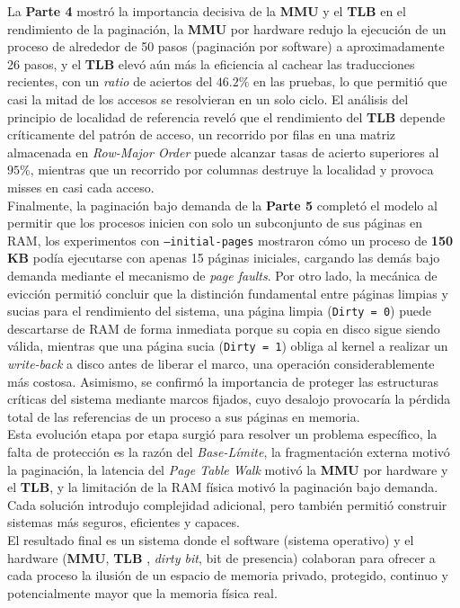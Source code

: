 \documentclass[12pt,letterpaper]{article}
\begin{document}
La \textbf{Parte 4} mostró la importancia decisiva de la \textbf{MMU} y el \textbf{TLB} en el rendimiento de la
paginación, la \textbf{MMU} por hardware redujo la ejecución de un proceso de alrededor de 50 pasos (paginación
por software) a aproximadamente 26 pasos, y el \textbf{TLB} elevó aún más la eficiencia al cachear las
traducciones recientes, con un \textit{ratio} de aciertos del $46.2\%$ en las pruebas, lo que permitió que casi
la mitad de los accesos se resolvieran en un solo ciclo. El análisis del principio de localidad de referencia
reveló que el rendimiento del \textbf{TLB} depende críticamente del patrón de acceso, un recorrido por filas en
una matriz almacenada en \textit{Row-Major Order} puede alcanzar tasas de acierto superiores al $95\%$, mientras
que un recorrido por columnas destruye la localidad y provoca misses en casi cada acceso.\\

Finalmente, la paginación bajo demanda de la \textbf{Parte 5} completó el modelo al permitir que los procesos
inicien con solo un subconjunto de sus páginas en RAM, los experimentos con \texttt{--initial-pages} mostraron
cómo un proceso de \textbf{150 KB} podía ejecutarse con apenas 15 páginas iniciales, cargando las demás bajo
demanda mediante el mecanismo de \textit{page faults}. Por otro lado, la mecánica de evicción permitió concluir
que la distinción fundamental entre páginas limpias y sucias para el rendimiento del sistema, una página limpia
(\texttt{Dirty = 0}) puede descartarse de RAM de forma inmediata porque su copia en disco sigue siendo válida,
mientras que una página sucia (\texttt{Dirty = 1}) obliga al kernel a realizar un \textit{write-back} a disco
antes de liberar el marco, una operación considerablemente más costosa. Asimismo, se confirmó la importancia de
proteger las estructuras críticas del sistema mediante marcos fijados, cuyo desalojo provocaría la pérdida total
de las referencias de un proceso a sus páginas en memoria.\\

Esta evolución etapa por etapa surgió para resolver un problema específico, la falta de protección es la razón
del \textit{Base-Límite}, la fragmentación externa motivó la paginación, la latencia del
\textit{Page Table Walk} motivó la \textbf{MMU} por hardware y el \textbf{TLB}, y la limitación de la RAM física
motivó la paginación bajo demanda. Cada solución introdujo complejidad adicional, pero también permitió
construir sistemas más seguros, eficientes y capaces.\\
El resultado final es un sistema donde el software (sistema operativo) y el hardware (\textbf{MMU}, \textbf{TLB}
, \textit{dirty bit}, bit de presencia) colaboran para ofrecer a cada proceso la ilusión de un espacio de
memoria privado, protegido, continuo y potencialmente mayor que la memoria física real.
\end{document}
